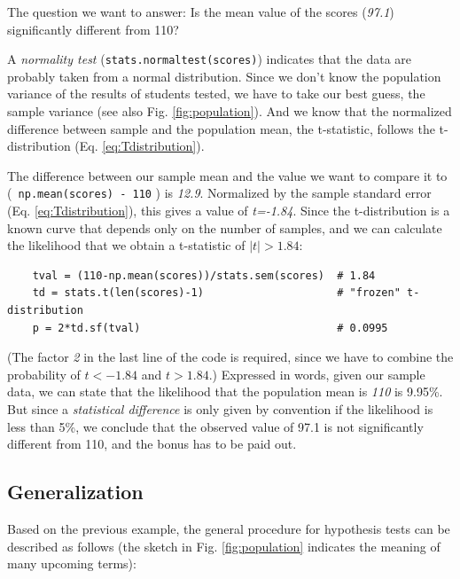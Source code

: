 The question we want to answer: Is the mean value of the scores (\emph{97.1}) significantly different from 110?

A \emph{normality test} (\lstinline{stats.normaltest(scores)}) indicates that the data are probably taken from a normal distribution.  Since we don't know the population variance of the results of students tested, we have to take our best guess, the sample variance (see also Fig. \ref{fig:population}). And we know that the normalized difference between sample and the population mean, the t-statistic, follows the t-distribution (Eq. \ref{eq:Tdistribution}).

The difference between our sample mean and the value we want to compare it to (\lstinline{ np.mean(scores) - 110} ) is \emph{12.9}. Normalized by the sample standard error (Eq. \ref{eq:Tdistribution}), this gives a value of \emph{t=-1.84}. Since the t-distribution is a known curve that depends only on the number of samples, and we can calculate the likelihood that we obtain a t-statistic of $|t| > 1.84$:

\begin{lstlisting}
    tval = (110-np.mean(scores))/stats.sem(scores)  # 1.84
    td = stats.t(len(scores)-1)                     # "frozen" t-distribution
    p = 2*td.sf(tval)                               # 0.0995
\end{lstlisting}

(The factor \emph{2} in the last line of the code is required, since we have to combine the probability of $t<-1.84$ and $t>1.84$.) Expressed in words, given our sample data, we can state that the likelihood that the population mean is \emph{110} is 9.95\%. But since a \emph{statistical difference} is only given by convention if the likelihood is less than 5\%, we conclude that the observed value of 97.1 is not significantly different from 110, and the bonus has to be paid out.

\subsection{Generalization}

Based on the previous example, the general procedure for hypothesis tests can be described as follows (the sketch in Fig. \ref{fig:population} indicates the meaning of many upcoming terms):

